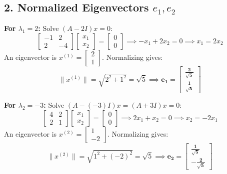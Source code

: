 \documentclass[11pt]{article}
\begin{document}
\subsection*{2. Normalized Eigenvectors $e_1, e_2$}

\textbf{For $\lambda_1 = 2$:}
Solve $(A - 2I)x = 0$:
\[
\begin{bmatrix} -1 & 2 \\ 2 & -4 \end{bmatrix} \begin{bmatrix} x_1 \\ x_2 \end{bmatrix} = \begin{bmatrix} 0 \\ 0 \end{bmatrix} \implies -x_1 + 2x_2 = 0 \implies x_1 = 2x_2
\]
An eigenvector is $x^{(1)} = \begin{bmatrix} 2 \\ 1 \end{bmatrix}$. Normalizing gives:
\[
\|x^{(1)}\| = \sqrt{2^2 + 1^2} = \sqrt{5} \implies \mathbf{e_1 = \begin{bmatrix} \frac{2}{\sqrt{5}} \\ \frac{1}{\sqrt{5}} \end{bmatrix}}
\]

\textbf{For $\lambda_2 = -3$:}
Solve $(A - (-3)I)x = (A + 3I)x = 0$:
\[
\begin{bmatrix} 4 & 2 \\ 2 & 1 \end{bmatrix} \begin{bmatrix} x_1 \\ x_2 \end{bmatrix} = \begin{bmatrix} 0 \\ 0 \end{bmatrix} \implies 2x_1 + x_2 = 0 \implies x_2 = -2x_1
\]
An eigenvector is $x^{(2)} = \begin{bmatrix} 1 \\ -2 \end{bmatrix}$. Normalizing gives:
\[
\|x^{(2)}\| = \sqrt{1^2 + (-2)^2} = \sqrt{5} \implies \mathbf{e_2 = \begin{bmatrix} \frac{1}{\sqrt{5}} \\ -\frac{2}{\sqrt{5}} \end{bmatrix}}
\]
\end{document}
